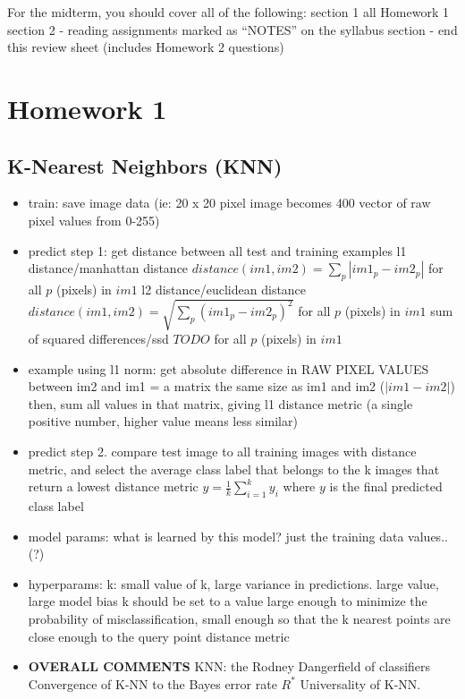\documentclass[10pt,letterpaper]{article}
\date{}
\begin{document}
For the midterm, you should cover all of the following:
\subitem section 1 all Homework 1
\subitem section 2 - reading assignments marked as “NOTES” on the syllabus
\subitem section  - end this review sheet (includes Homework 2 questions)

\section{Homework 1}
\begin{solution}
\subsection{K-Nearest Neighbors (KNN)}
\begin{itemize}
\item train: save image data (ie: 20 x 20 pixel image becomes 400 vector of raw pixel values from 0-255)
\item predict step 1: get distance between all test and training examples
\newline
\newline l1 distance/manhattan distance
\newline $distance(im1, im2) = \sum_p{|im1_p - im2_p|}$ for all $p$ (pixels) in $im1$ 
\newline l2 distance/euclidean distance
\newline $distance(im1, im2) = \sqrt{\sum_p{(im1_p - im2_p)^2}}$ for all $p$ (pixels) in $im1$ 
\newline sum of squared differences/ssd
\newline $TODO$ for all $p$ (pixels) in $im1$ 
\item example using l1 norm: 
\subitem get absolute difference in RAW PIXEL VALUES between im2 and im1
\subitem  = a matrix the same size as im1 and im2 ($|im1-im2|$)  
\subitem then, sum all values in that matrix, giving l1 distance metric 
\subitem (a single positive number, higher value means less similar)
\item predict step 2. compare test image to all training images with distance metric, and select the average class label that belongs to the k images that return a lowest distance metric
\newline $y = \frac{1}{k}\sum\limits_{i=1}^k{ y_i}$ where $y$ is the final predicted class label
\item model params:
\subitem what is learned by this model? just the training data values.. (?)
\item hyperparams:
\subitem k: small value of k, large variance in predictions. large value, large model bias
\subitem k should be set to a value large enough to minimize the probability of misclassification, small enough so that the k nearest points are close enough to the query point
\subitem distance metric
\item \textbf{OVERALL COMMENTS}
\subitem
\subitem
\subitem KNN: the Rodney Dangerfield of classifiers 
\subitem Convergence of K-NN to the Bayes error rate $R^*$
\subitem Universality of K-NN.
\end{itemize}
\end{solution}
\end{document}
